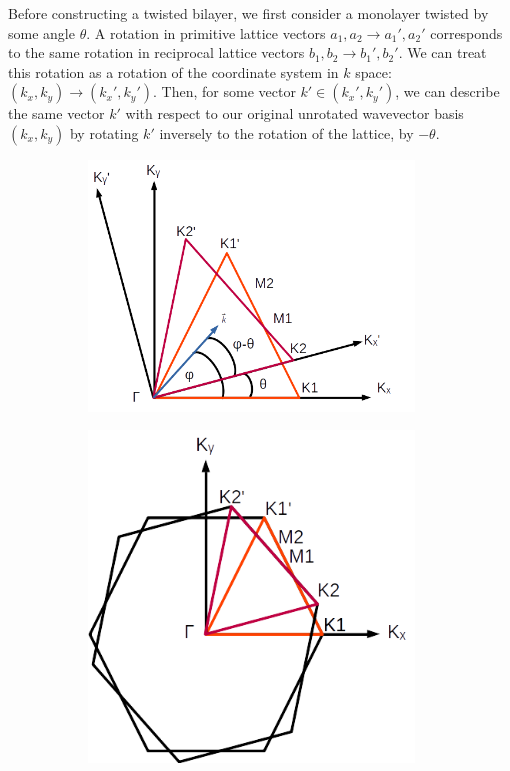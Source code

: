 \documentclass[12pt]{report} %
\begin{document}
  Before constructing a twisted bilayer, we first consider a monolayer twisted by some angle $\theta$. A rotation in primitive lattice vectors $a_1, a_2 \rightarrow a_1', a_2'$ corresponds to the same rotation in reciprocal lattice vectors $b_1, b_2 \rightarrow b_1', b_2'$. We can treat this rotation as a rotation of the coordinate system in $k$ space: $(k_x, k_y) \rightarrow (k_x', k_y')$. Then, for some vector $k' \in (k_x', k_y')$, we can describe the same vector $k'$ with respect to our original unrotated wavevector basis $(k_x, k_y)$ by rotating $k'$ inversely to the rotation of the lattice, by $-\theta$.
%
\begin{figure}[ht!]
\centering
  \begin{subfigure}[t]{0.475\textwidth}
    \centering
    \includegraphics[width=0.95\textwidth]{twisted_triangles.png}
    \caption{
    }
    \label{twisted_triangles}
  \end{subfigure}
  \hfill
  \begin{subfigure}[t]{0.475\textwidth}
    \centering
    \includegraphics[width=0.95\textwidth]{heterostructure_BZ_path.png}

\end{subfigure}
\end{figure}
\end{document}
